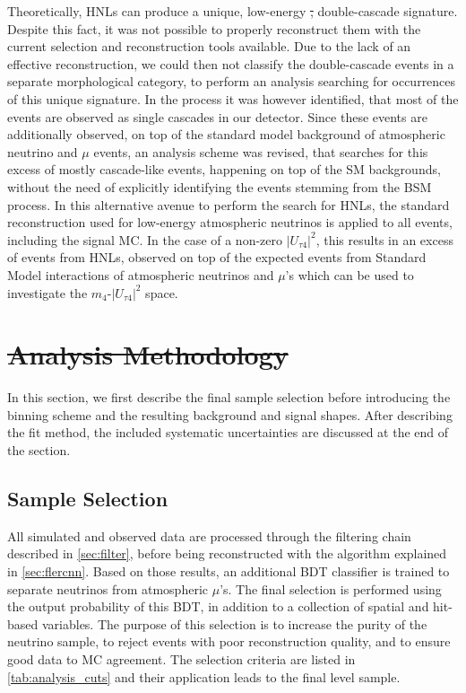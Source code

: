 \documentclass[
    aps,
    prd,
    reprint,
    amsmath,
    amssymb,
    nofootinbib,
    linenumbers,
    superscriptaddress,
    floatfix
]{revtex4-2}
\def\ut4{$|U_{\tau4}|^2$}
\providecommand{\DIFdeltex}[1]{{\protect\color{red}\sout{#1}}}                      %
\providecommand{\DIFaddend}{} %
\providecommand{\DIFdelbegin}{} %
\providecommand{\DIFdelend}{} %
\providecommand{\DIFdel}[1]{\texorpdfstring{\DIFdeltex{#1}}{}} %
\newcommand{\DIFscaledelfig}{0.5}
\newlength{\DIFdelgraphicswidth} %
\newlength{\DIFdelgraphicsheight} %
\newcommand{\DIFdelincludegraphics}[2][]{%
\sbox{\DIFdelgraphicsbox}{\DIFOincludegraphics[#1]{#2}}%
\settoboxwidth{\DIFdelgraphicswidth}{\DIFdelgraphicsbox} %
\settoboxtotalheight{\DIFdelgraphicsheight}{\DIFdelgraphicsbox} %
\scalebox{\DIFscaledelfig}{%
\parbox[b]{\DIFdelgraphicswidth}{\usebox{\DIFdelgraphicsbox}\\[-\baselineskip] \rule{\DIFdelgraphicswidth}{0em}}\llap{\resizebox{\DIFdelgraphicswidth}{\DIFdelgraphicsheight}{%
\setlength{\unitlength}{\DIFdelgraphicswidth}%
\begin{picture}(1,1)%
\thicklines\linethickness{2pt} %
{\color[rgb]{1,0,0}\put(0,0){\framebox(1,1){}}}%
{\color[rgb]{1,0,0}\put(0,0){\line( 1,1){1}}}%
{\color[rgb]{1,0,0}\put(0,1){\line(1,-1){1}}}%
\end{picture}%
}\hspace*{3pt}}} %
} %
\DeclareRobustCommand{\DIFaddend}{\DIFOaddend \let\includegraphics\DIFOincludegraphics} %
\DeclareRobustCommand{\DIFdelbegin}{\DIFOdelbegin \let\includegraphics\DIFdelincludegraphics} %
\DeclareRobustCommand{\DIFdelend}{\DIFOaddend \let\includegraphics\DIFOincludegraphics} %
\begin{document}
\DIFaddend Theoretically, HNLs can produce a unique, low-energy \DIFdelbegin \DIFdel{, }\DIFdelend double-cascade signature. Despite this fact, it was not possible to properly reconstruct them with the current selection and reconstruction tools available. Due to the lack of an effective reconstruction, we could then not classify the double-cascade events in a separate morphological category, to perform an analysis searching for occurrences of this unique signature. In the process it was however identified, that most of the events are observed as single cascades in our detector. Since these events are additionally observed, on top of the standard model background of atmospheric neutrino and $\mu$ events, an analysis scheme was revised, that searches for this excess of mostly cascade-like events, happening on top of the SM backgrounds, without the need of explicitly identifying the events stemming from the BSM process. In this alternative avenue to perform the search for HNLs, the standard reconstruction used for low-energy atmospheric neutrinos is applied to all events, including the signal MC. In the case of a non-zero \ut4, this results in an excess of events from HNLs, observed on top of the expected events from Standard Model interactions of atmospheric neutrinos and $\mu$'s which can be used to investigate the $m_4$-\ut4 space.

\DIFdelbegin %

\section{%
\DIFdel{Analysis Methodology}}
\addtocounter{section}{-1}%

\DIFdelend In this section, we first describe the final sample selection before introducing the binning scheme and the resulting background and signal shapes. After describing the fit method, the included systematic uncertainties are discussed at the end of the section.


\subsection{\label{sec:sample}Sample Selection}

All simulated and observed data are processed through the filtering chain described in \cref{sec:filter}, before being reconstructed with the algorithm explained in \cref{sec:flercnn}.
Based on those results, an additional BDT classifier is trained to separate neutrinos from atmospheric $\mu$'s.
The final selection is performed using the output probability of this BDT, in addition to a collection of spatial and hit-based variables.
The purpose of this selection is to increase the purity of the neutrino sample, to reject events with poor reconstruction quality, and to ensure good data to MC agreement.
The selection criteria are listed in \cref{tab:analysis_cuts} and their application leads to the final level sample.
\end{document}
